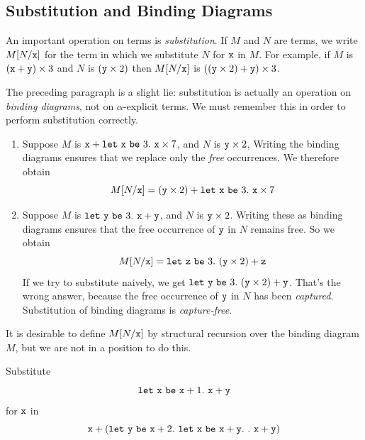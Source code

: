 \documentclass[runningheads,12pt]{llncs}
\newcommand{\ttletmac}[2]{\mathtt{let}\ {#2}\ \mathtt{be}\ {#1}.\ }
\begin{document}
\subsection{Substitution and Binding Diagrams}

An important operation on terms is \emph{substitution}.  If $M$ and $N$ are terms, we write $M[N/\mathtt{x}]$ for the term in which we substitute $N$ for $\mathtt{x}$ in $M$. For example, if $M$ is $(\mathtt{x}+\mathtt{y}) \times
  3$ and $N$ is $(\mathtt{y} \times 2)$ then $M[N/\mathtt{x}]$ is $((\mathtt{y} \times
  2)+\mathtt{y}) \times 3$.  

The preceding paragraph is a slight lie: substitution is actually an operation on \emph{binding diagrams}, not on $\alpha$-explicit terms.  We must remember this in order to perform substitution correctly.
  \begin{enumerate}
  \item Suppose $M$ is $\ttx + \ttletmac{ 3 }{ \ttx } \ttx \times 7$, and $N $ is $\mathtt{y} \times 2$,  Writing the binding diagrams ensures that we replace only the \emph{free} occurrences.   We therefore obtain
  \begin{displaymath}
M[N/\ttx] = (\tty \times 2) + \ttletmac{ 3 }{ \ttx } \ttx \times 7
\end{displaymath}
  \item Suppose  $M$ is $\ttletmac{ 3 }{ \tty } \ttx + \tty$, and $N$ is $\mathtt{y} \times 2$.  Writing these as binding diagrams ensures that the free occurrence of $\mathtt{y}$ in $N$ remains free.  So we obtain
    \begin{displaymath}
M[N/\ttx] = \ttletmac{ 3 }{ \ttz } (\tty \times 2) + \ttz
\end{displaymath}
If we try to substitute naively, we get $\ttletmac{ 3 }{ \tty } (\tty \times 2) + \tty$.  That's the wrong answer, because the free occurrence of $\mathtt{y}$ in $N$ has been \emph{captured}.  Substitution of binding diagrams is \emph{capture-free}.
  \end{enumerate}
It is desirable to define $M[N/\mathtt{x}]$ by structural recursion over the binding diagram $M$, but we are not in a position to do this. 

  \begin{exercise}
    Substitute
    \begin{displaymath}
      \ttletmac{ \ttx+1 }{ \ttx } \ttx + \tty
    \end{displaymath}
 for $\mathtt{x}$ in
 \begin{displaymath}
   \ttx + (\ttletmac{ \ttx + 2 }{ \tty } \ttletmac{ \ttx + \tty }{ \ttx } \ttin \ttx+\tty)
 \end{displaymath}
  \end{exercise}
\end{document}
